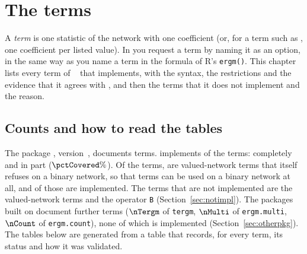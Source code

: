 \chapter{The terms}\label{ch:terms}

A \emph{term} is one statistic of the network with one coefficient (or, for a term such as , one coefficient per listed value). In \nwergm{} you request a term by naming it as an option, in the same way as you name a term in the formula of R's \texttt{ergm()}. This chapter lists every term of \ergm{}~\ergmver{} that \nwergm{} implements, with the syntax, the restrictions and the evidence that it agrees with \ergm{}, and then the terms that it does not implement and the reason.

\section{Counts and how to read the tables}

The package \ergm{}, version~\ergmver{}, documents \nErgm{} terms. \nwergm{} implements \nCovered{} of the \nErgm{} terms: \nImpl{} completely and \nPartial{} in part ($\pctCovered\%$). Of the \nErgm{} terms, \nValued{} are valued-network terms that \ergm{} itself refuses on a binary network, so that \nBinary{} terms can be used on a binary network at all, and \nCovered{} of those are implemented. The \nNotPlanned{} terms that are not implemented are the \nValued{} valued-network terms and the operator \texttt{B} (Section~\ref{sec:notimpl}). The packages built on \ergm{} document \nOther{} further terms ($\nTergm$ of \texttt{tergm}, $\nMulti$ of \texttt{ergm.multi}, $\nCount$ of \texttt{ergm.count}), none of which is implemented (Section~\ref{sec:otherpkg}). The tables below are generated from a table that records, for every term, its status and how it was validated.

